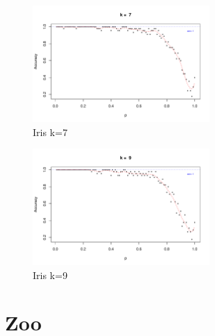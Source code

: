 \documentclass{article}
\begin{document}
\begin{figure}
 \centering
 \includegraphics[width=0.6\textwidth]{./figures/Iris_k7.pdf}
 \caption{Iris k=7}
 \label{fig:iris7}
\end{figure}
\begin{figure}
 \centering
 \includegraphics[width=0.6\textwidth]{./figures/Iris_k9.pdf}
 \caption{Iris k=9}
 \label{fig:iris9}
\end{figure}

\FloatBarrier
\section{Zoo}
\end{document}
